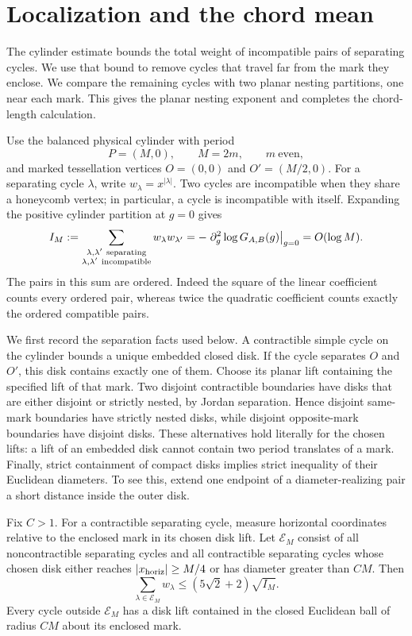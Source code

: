 \section{Localization and the chord mean}\label{c7:localization}

The cylinder estimate bounds the total weight of incompatible pairs of
separating cycles. We use that bound to remove cycles that travel far
from the mark they enclose. We compare the remaining cycles with two
planar nesting partitions, one near each mark. This gives the planar nesting
exponent and completes the chord-length calculation.

Use the balanced physical cylinder with period
\[
 P=(M,0),\qquad M=2m,\qquad m\ \text{even},
\]
and marked tessellation vertices \(O=(0,0)\) and \(O'=(M/2,0)\).
For a separating cycle \(\lambda\), write
\(w_\lambda=x^{|\lambda|}\). Two cycles are incompatible when they
share a honeycomb vertex; in particular, a cycle is incompatible with
itself. Expanding the positive cylinder partition at \(g=0\) gives
\[
 I_M:=\sum_{\substack{\lambda,\lambda'\ {\rm separating}\\
                 \lambda,\lambda'\ {\rm incompatible}}}
          w_\lambda w_{\lambda'}
   =-\left.\partial_g^2\log G_{A,B}(g)\right|_{g=0}
   =O(\log M).
\]
The pairs in this sum are ordered. Indeed the square of the linear
coefficient counts every ordered pair, whereas twice the quadratic
coefficient counts exactly the ordered compatible pairs.

We first record the separation facts used below. A contractible simple
cycle on the cylinder bounds a unique embedded closed disk. If the cycle
separates \(O\) and \(O'\), this disk contains exactly one of them.
Choose its planar lift containing the specified lift of that mark. Two
disjoint contractible boundaries have disks that are either disjoint or
strictly nested, by Jordan separation. Hence disjoint same-mark
boundaries have strictly nested disks, while disjoint opposite-mark
boundaries have disjoint disks. These alternatives hold literally for
the chosen lifts: a lift of an embedded disk cannot contain two period
translates of a mark. Finally, strict containment of compact disks
implies strict inequality of their Euclidean diameters. To see this,
extend one endpoint of a diameter-realizing pair a short distance inside
the outer disk.

\begin{lemma}\label{j:localization-escape}
Fix \(C>1\). For a contractible separating cycle, measure horizontal
coordinates relative to the enclosed mark in its chosen disk lift.
Let \(\mathcal E_M\) consist of all noncontractible separating cycles
and all contractible separating cycles whose chosen disk either reaches
\(|x_{\rm horiz}|\ge M/4\) or has diameter greater than \(CM\).
Then
\[
 \sum_{\lambda\in\mathcal E_M}w_\lambda
 \le (5\sqrt2+2)\sqrt{I_M}.
\]
Every cycle outside \(\mathcal E_M\) has a disk lift contained in the
closed Euclidean ball of radius \(CM\) about its enclosed mark.
\end{lemma}

